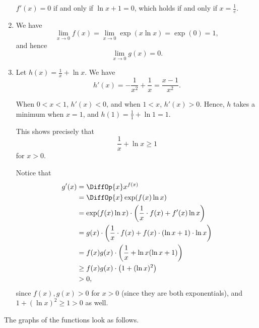 \begin{enumerate}
          \(f'(x) = 0\) if and only if \(\ln x + 1 = 0\), which holds if and only if \(x = \frac{1}{e}\).

    \item We have
          \[
              \lim_{x \to 0} f(x) = \lim_{x \to 0} \exp(x \ln x) = \exp (0) = 1,
          \]
          and hence
          \[
              \lim_{x \to 0} g(x) = 0.
          \]

    \item Let \(h(x) = \frac{1}{x} + \ln x\). We have
          \[
              h'(x) = - \frac{1}{x^2} + \frac{1}{x} = \frac{x - 1}{x^2}.
          \]

          When \(0 < x < 1\), \(h'(x) < 0\), and when \(1 < x\), \(h'(x) > 0\). Hence, \(h\) takes a minimum when \(x = 1\), and \(h(1) = \frac{1}{1} + \ln 1 = 1\).

          This shows precisely that
          \[
              \frac{1}{x} + \ln x \geq 1
          \]
          for \(x > 0\).

          Notice that
          \begin{align*}
              g'(x) & = \DiffOp{x} x^{f(x)}                                                                 \\
                    & = \DiffOp{x} \exp (f(x) \ln x)                                                        \\
                    & = \exp(f(x) \ln x) \cdot \left(\frac{1}{x} \cdot f(x) + f'(x) \ln x\right)            \\
                    & = g(x) \cdot \left(\frac{1}{x} \cdot f(x) + f(x) \cdot (\ln x + 1) \cdot \ln x\right) \\
                    & = f(x) g(x) \cdot \left(\frac{1}{x} + \ln x (\ln x + 1)\right)                        \\
                    & \geq f(x) g(x) \cdot \left(1 + (\ln x)^2\right)                                       \\
                    & > 0,
          \end{align*}
          since \(f(x), g(x) > 0\) for \(x > 0\) (since they are both exponentials), and \(1 + (\ln x)^2 \geq 1 > 0\) as well.
\end{enumerate}

The graphs of the functions look as follows.

\begin{center}
    
\end{center}